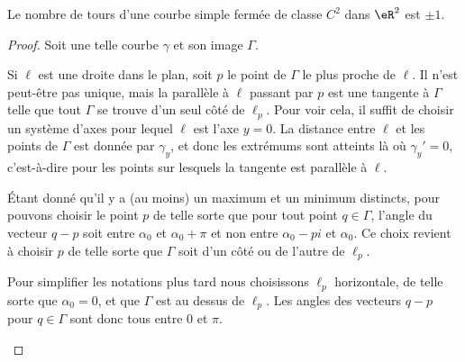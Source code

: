 \begin{theorem}      \label{THOooEQWOooBCRMMZ}
	Le nombre de tours d'une courbe simple fermée de classe \(  C^{2}\) dans \( \eR^2\) est \( \pm 1\).
\end{theorem}

\begin{proof}
	Soit une telle courbe \( \gamma\) et son image \( \Gamma\).
	\begin{subproof}

		Si \( \ell\) est une droite dans le plan, soit \( p\) le point de \( \Gamma\) le plus proche de \( \ell\). Il n'est peut-être pas unique, mais la parallèle à \( \ell\) passant par \( p\) est une tangente à \( \Gamma\) telle que tout \( \Gamma\) se trouve d'un seul côté de \( \ell_p\). Pour voir cela, il suffit de choisir un système d'axes pour lequel \( \ell\) est l'axe \( y=0\). La distance entre \( \ell\) et les points de \( \Gamma\) est donnée par \( \gamma_y\), et donc les extrémums sont atteints là où \( \gamma_y'=0\), c'est-à-dire pour les points sur lesquels la tangente est parallèle à \( \ell\).

		Étant donné qu'il y a (au moins) un maximum et un minimum distincts, pour pouvons choisir le point \( p\) de telle sorte que pour tout point \( q\in \Gamma\), l'angle du vecteur \( q-p\) soit entre \( \alpha_0\) et \( \alpha_0+\pi\) et non entre \( \alpha_0-pi\) et \( \alpha_0\). Ce choix revient à choisir \( p\) de telle sorte que \( \Gamma\) soit d'un côté ou de l'autre de \( \ell_p\).

		Pour simplifier les notations plus tard nous choisissons \( \ell_p\) horizontale, de telle sorte que \( \alpha_0=0\), et que \( \Gamma\) est au dessus de \( \ell_p\). Les angles des vecteurs \( q-p\) pour \( q\in \Gamma\) sont donc tous entre \( 0\) et \( \pi\).



\end{subproof}
\end{proof}
